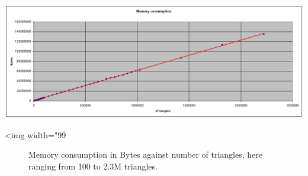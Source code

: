 \begin{center}
    \label{fig:AABB-tree-memory}
    \begin{ccTexOnly}
      \includegraphics[width=1.0\textwidth]{AABB_tree/memory}
    \end{ccTexOnly}
    \begin{ccHtmlOnly}
        <img width="99%
    \end{ccHtmlOnly}
    \begin{figure}[h]
        \caption{Memory consumption in Bytes against number of triangles, here
                 ranging from 100 to 2.3M triangles.}
    \end{figure}
\end{center}

